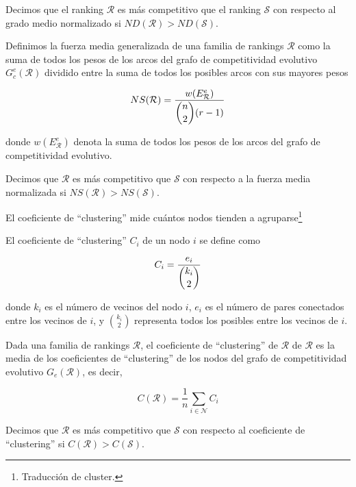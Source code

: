 \begin{defi}
Decimos que el ranking $\mathcal{R}$ es más competitivo que el ranking $\mathcal{S}$ con respecto al grado medio normalizado si $ND(\mathcal{R}) > ND(\mathcal{S})$.
\end{defi}

\begin{defi}
Definimos la fuerza media generalizada de una familia de rankings $\mathcal{R}$ como la suma de todos los pesos de los arcos del grafo de competitividad evolutivo $G_c^e(\mathcal{R})$ dividido entre la suma de todos los posibles arcos con sus mayores pesos

\[ NS(\mathcal{R}) = \dfrac{w(E_\mathcal{R}^e)}{\dbinom{n}{2}(r-1)} \]

donde  $w(E_\mathcal{R}^e)$ denota la suma de todos los pesos de los arcos del grafo de competitividad evolutivo.
\end{defi}

\begin{defi}
Decimos que $\mathcal{R}$ es más competitivo que $\mathcal{S}$ con respecto a la fuerza media normalizada si $NS(\mathcal{R}) > NS(\mathcal{S})$.
\end{defi}

\begin{nota}
El coeficiente de ``clustering'' mide cuántos nodos tienden a agruparse\footnote{Traducción de cluster.}
\end{nota}

\begin{defi}
El coeficiente de ``clustering'' $C_i$ de un nodo $i$ se define como

\[ C_i = \dfrac{e_i}{\dbinom{k_i}{2}} \]

donde $k_i$ es el número de vecinos del nodo $i$, $e_i$ es el número de pares conectados entre los vecinos de $i$, y $\binom{k_i}{2}$ representa todos los posibles entre los vecinos de $i$.
\end{defi}

\begin{defi}
Dada una familia de rankings $\mathcal{R}$, el coeficiente de ``clustering'' de $\mathcal{R}$ de $\mathcal{R}$ es la media de los coeficientes de ``clustering'' de los nodos del grafo de competitividad evolutivo $G_e(\mathcal{R})$, es decir,

\[ C(\mathcal{R}) = \dfrac{1}{n} \sum_{i \in \mathcal{N}} C_i \]
\end{defi}

\begin{defi}
Decimos que $\mathcal{R}$ es más competitivo que $\mathcal{S}$ con respecto al coeficiente de ``clustering'' si $C(\mathcal{R}) > C(\mathcal{S})$.
\end{defi}

